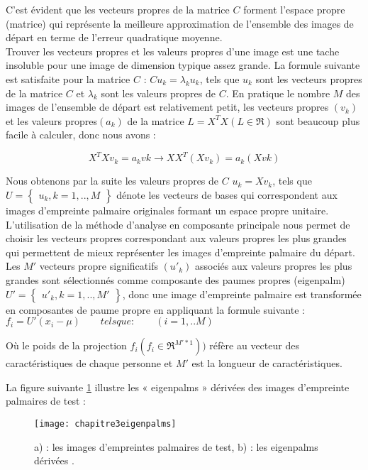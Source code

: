 C'est évident que les vecteurs propres de la matrice $C$ forment l'espace propre (matrice) qui représente la meilleure approximation de l'ensemble des images de départ en terme de l'erreur quadratique moyenne.
\\Trouver les vecteurs propres et les valeurs propres d'une image est une tache insoluble pour une image de dimension typique assez grande. La formule suivante est satisfaite pour la matrice $C$ : $Cu_{k}= \lambda_{k}u_{k}$, tels que $u_{k}$ sont les vecteurs propres de la matrice $C $ et $\lambda_{k}$ sont les valeurs propres de $C$.
En pratique le nombre $M$ des images de l'ensemble de départ est relativement petit, les vecteurs propres $(v_{k})$ et les valeurs propres$(a_{k})$ de la matrice $ L=X^{T}X(L \in\Re)$ sont beaucoup plus facile à calculer, donc nous avons : 
\begin{center}
	\begin{equation}\label{eq:chapitre3eq3}
	X^{T}Xv_{k}=a_{k}v{k} \rightarrow XX^{T}(Xv_{k})=a_{k}(Xv{k})
	\end{equation}
\end{center}
Nous obtenons par la suite les valeurs propres de $C$ $u_{k}=Xv_{k}$, tels que $ U=\begin{Bmatrix}u_{k},k=1,..,M \end{Bmatrix} $ dénote les vecteurs de bases qui correspondent aux images d'empreinte palmaire originales formant un espace propre unitaire.
\\ L'utilisation de la méthode d'analyse en composante principale nous permet de choisir les vecteurs propres correspondant aux valeurs propres les plus grandes qui permettent de mieux représenter les images d'empreinte palmaire du départ. Les $ {M}'$ vecteurs propre significatifs $({u}'_{k})$ associés aux valeurs propres les plus grandes sont sélectionnés comme composante des paumes propres (eigenpalm) $ {U}'=\begin{Bmatrix} {u}'_{k},k=1,..,{M}'\end{Bmatrix} $, donc une image d'empreinte palmaire est transformée en composantes de paume propre en appliquant la formule suivante : $f_{i}={U}'(x_{i}-\mu) \qquad tels que :\qquad (i=1,..M)$

Où le poids de la projection $f_{i}(f_{i} \in \Re ^{{M}'*1}))$ réfère au vecteur des caractéristiques de chaque personne et $ {M}'$ est la longueur de caractéristiques\citep{lu2003palmprint}.

La figure suivante \ref{fig:chapitre3eigenpalms} illustre les « eigenpalms » dérivées des images d'empreinte palmaires de test :
\begin{center}
	\begin{figure}[H]
		\centering
		\texttt{[image: chapitre3eigenpalms]}
		\caption{a) : les images d'empreintes palmaires de test, b) : les eigenpalms dérivées \citep{lu2003palmprint}.}
		\label{fig:chapitre3eigenpalms}
	\end{figure}
\end{center}
